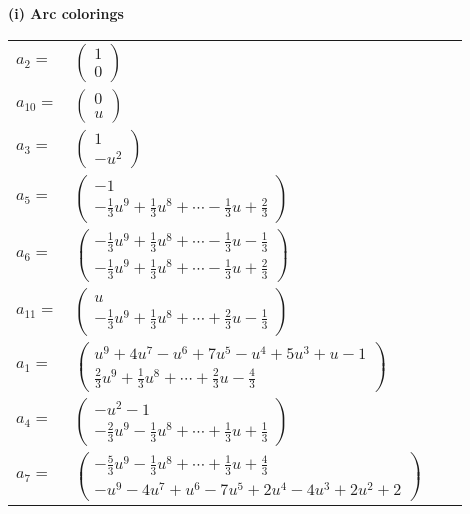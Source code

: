 \documentclass[1p]{elsarticle_modified}
\theoremstyle{definition}
\begin{document}
\flushleft \textbf{(i) Arc colorings}\\
\begin{tabular}{m{7pt} m{180pt} m{7pt} m{180pt} }
\flushright $a_{2}=$&$\begin{pmatrix}1\\0\end{pmatrix}$ \\
\flushright $a_{10}=$&$\begin{pmatrix}0\\u\end{pmatrix}$ \\
\flushright $a_{3}=$&$\begin{pmatrix}1\\- u^2\end{pmatrix}$ \\
\flushright $a_{5}=$&$\begin{pmatrix}-1\\-\frac{1}{3} u^9+\frac{1}{3} u^8+\cdots-\frac{1}{3} u+\frac{2}{3}\end{pmatrix}$ \\
\flushright $a_{6}=$&$\begin{pmatrix}-\frac{1}{3} u^9+\frac{1}{3} u^8+\cdots-\frac{1}{3} u-\frac{1}{3}\\-\frac{1}{3} u^9+\frac{1}{3} u^8+\cdots-\frac{1}{3} u+\frac{2}{3}\end{pmatrix}$ \\
\flushright $a_{11}=$&$\begin{pmatrix}u\\-\frac{1}{3} u^9+\frac{1}{3} u^8+\cdots+\frac{2}{3} u-\frac{1}{3}\end{pmatrix}$ \\
\flushright $a_{1}=$&$\begin{pmatrix}u^9+4 u^7- u^6+7 u^5- u^4+5 u^3+u-1\\\frac{2}{3} u^9+\frac{1}{3} u^8+\cdots+\frac{2}{3} u-\frac{4}{3}\end{pmatrix}$ \\
\flushright $a_{4}=$&$\begin{pmatrix}- u^2-1\\-\frac{2}{3} u^9-\frac{1}{3} u^8+\cdots+\frac{1}{3} u+\frac{1}{3}\end{pmatrix}$ \\
\flushright $a_{7}=$&$\begin{pmatrix}-\frac{5}{3} u^9-\frac{1}{3} u^8+\cdots+\frac{1}{3} u+\frac{4}{3}\\- u^9-4 u^7+u^6-7 u^5+2 u^4-4 u^3+2 u^2+2\end{pmatrix}$ \\

\end{tabular}
\end{document}
